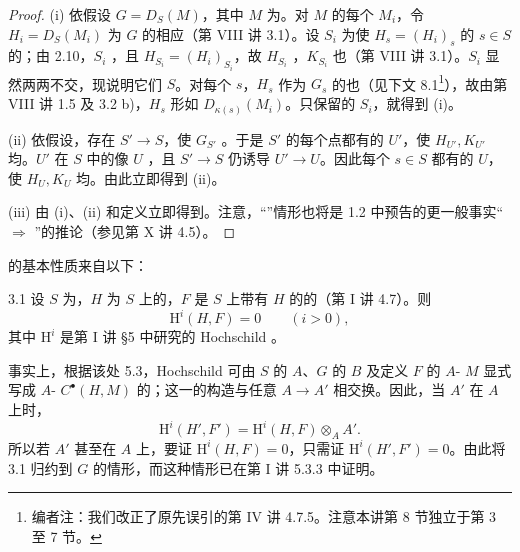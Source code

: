 \begin{proof}
(i) 依假设 $G=D_S(M)$，其中 $M$ 为。对 $M$ 的每个 $M_i$，令 $H_i=D_S(M_i)$ 为 $G$ 的相应（第 VIII 讲 3.1）。设 $S_i$ 为使 $H_s=(H_i)_s$ 的 $s\in S$ 的；由 2.10，$S_i$ ，且 $H_{S_i}=(H_i)_{S_i}$，故 $H_{S_i}$ ，$K_{S_i}$ 也（第 VIII 讲 3.1）。$S_i$ 显然两两不交，现说明它们 $S$。对每个 $s$，$H_s$ 作为 $G_s$ 的也（见下文 8.1\footnote{编者注：我们改正了原先误引的第 IV 讲 4.7.5。注意本讲第 8 节独立于第 3 至 7 节。}），故由第 VIII 讲 1.5 及 3.2 b)，$H_s$ 形如 $D_{\kappa(s)}(M_i)$。只保留的 $S_i$，就得到 (i)。

(ii) 依假设，存在 $S'\to S$，使 $G_{S'}$ 。于是 $S'$ 的每个点都有的 $U'$，使 $H_{U'},K_{U'}$ 均。$U'$ 在 $S$ 中的像 $U$ ，且 $S'\to S$ 仍诱导 $U'\to U$。因此每个 $s\in S$ 都有的 $U$，使 $H_U,K_U$ 均。由此立即得到 (ii)。

(iii) 由 (i)、(ii) 和定义立即得到。注意，“”情形也将是 1.2 中预告的更一般事实“ $\Rightarrow$ ”的推论（参见第 X 讲 4.5）。
\end{proof}
的基本性质来自以下：
\begin{SGAresult}{}{3.1}
设 $S$ 为，$H$ 为 $S$ 上的，$F$ 是 $S$ 上带有 $H$ 的的（第 I 讲 4.7）。则
\[\mathrm H^i(H,F)=0\qquad(i>0),\]
其中 $\mathrm H^i$ 是第 I 讲 \S5 中研究的 Hochschild 。
\end{SGAresult}
事实上，根据该处 5.3，Hochschild 可由 $S$ 的 $A$、$G$ 的 $B$ 及定义 $F$ 的 $A$- $M$ 显式写成 $A$- $C^\bullet(H,M)$ 的；这一的构造与任意 $A\to A'$ 相交换。因此，当 $A'$ 在 $A$ 上时，
\[\mathrm H^i(H',F')=\mathrm H^i(H,F)\otimes_A A'.\]
所以若 $A'$ 甚至在 $A$ 上，要证 $\mathrm H^i(H,F)=0$，只需证 $\mathrm H^i(H',F')=0$。由此将 3.1 归约到 $G$ 的情形，而这种情形已在第 I 讲 5.3.3 中证明。

